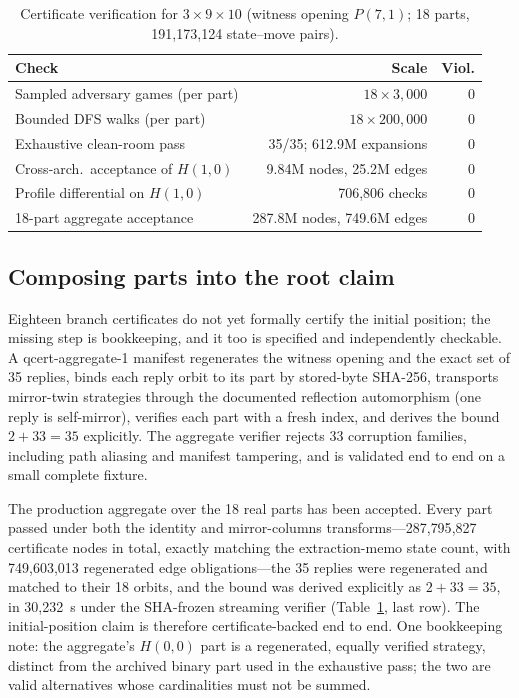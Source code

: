 \documentclass[conference]{IEEEtran}
\newcommand{\varSpec}[3]{$#1{\times}#2{\times}#3$}
\begin{document}
\begin{table}[t]
\centering
\caption{Certificate verification for \varSpec{3}{9}{10} (witness opening $P(7,1)$; 18 parts, 191{,}173{,}124 state--move pairs).}
\label{tab:cert}
\setlength{\tabcolsep}{3pt}
\begin{tabular}{lrr}
\toprule
Check & Scale & Viol. \\
\midrule
Sampled adversary games (per part) & $18\times 3{,}000$ & 0 \\
Bounded DFS walks (per part) & $18\times 200{,}000$ & 0 \\
Exhaustive clean-room pass & 35/35; 612.9M expansions & 0 \\
Cross-arch.\ acceptance of $H(1,0)$ & 9.84M nodes, 25.2M edges & 0 \\
Profile differential on $H(1,0)$ & 706{,}806 checks & 0 \\
18-part aggregate acceptance & 287.8M nodes, 749.6M edges & 0 \\
\bottomrule
\end{tabular}
\end{table}

\subsection{Composing parts into the root claim}

Eighteen branch certificates do not yet formally certify the initial position; the missing step is bookkeeping, and it too is specified and independently checkable. A \textsf{qcert-aggregate-1} manifest regenerates the witness opening and the exact set of 35 replies, binds each reply orbit to its part by stored-byte SHA-256, transports mirror-twin strategies through the documented reflection automorphism (one reply is self-mirror), verifies each part with a fresh index, and derives the bound $2 + 33 = 35$ explicitly. The aggregate verifier rejects 33 corruption families, including path aliasing and manifest tampering, and is validated end to end on a small complete fixture.

The production aggregate over the 18 real parts has been accepted. Every part passed under both the identity and mirror-columns transforms---287{,}795{,}827 certificate nodes in total, exactly matching the extraction-memo state count, with 749{,}603{,}013 regenerated edge obligations---the 35 replies were regenerated and matched to their 18 orbits, and the bound was derived explicitly as $2+33=35$, in 30{,}232~s under the SHA-frozen streaming verifier (Table~\ref{tab:cert}, last row). The initial-position claim is therefore certificate-backed end to end. One bookkeeping note: the aggregate's $H(0,0)$ part is a regenerated, equally verified strategy, distinct from the archived binary part used in the exhaustive pass; the two are valid alternatives whose cardinalities must not be summed.
\end{document}
